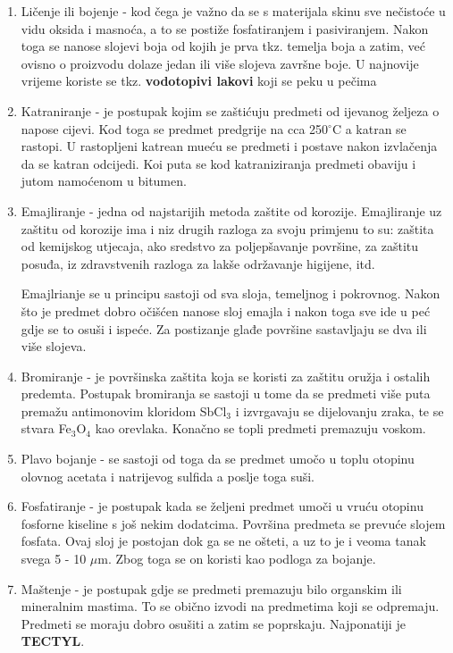 \documentclass[a4paper,12pt]{article}
\numberwithin{figure}{section}
\begin{document}
\begin{enumerate}
\item Ličenje ili bojenje - kod čega je važno da se s materijala skinu sve nečistoće u vidu oksida i masnoća, a to se postiže fosfatiranjem i pasiviranjem. Nakon toga se nanose slojevi boja od kojih je prva tkz. temelja boja a zatim, već ovisno o proizvodu dolaze jedan ili više slojeva završne boje. U najnovije vrijeme koriste se tkz. \textbf{vodotopivi lakovi} koji se peku u pečima
\item Katraniranje - je postupak kojim se zaštićuju predmeti od ijevanog željeza o napose cijevi. Kod toga se predmet predgrije na cca 250$^{\circ}$C a katran se rastopi. U rastopljeni katrean mueću se predmeti i postave nakon izvlačenja da se katran odcijedi. Koi puta se kod katraniziranja predmeti obaviju i jutom namoćenom u bitumen.
\item Emajliranje - jedna od najstarijih metoda zaštite od korozije. Emajliranje uz zaštitu od korozije ima i niz drugih razloga za svoju primjenu to su: zaštita od kemijskog utjecaja, ako sredstvo za poljepšavanje površine, za zaštitu posuđa, iz zdravstvenih razloga za lakše održavanje higijene, itd.\par
Emajlrianje se u principu sastoji od sva sloja, temeljnog i pokrovnog. Nakon što je predmet dobro očišćen nanose sloj emajla i nakon toga sve ide u peć gdje se to osuši i ispeće. Za postizanje glađe površine sastavljaju se dva ili više slojeva.
\item Bromiranje - je površinska zaštita koja se koristi za zaštitu oružja i ostalih predemta. Postupak bromiranja se sastoji u tome da se predmeti više puta premažu antimonovim kloridom SbCl$_{3}$ i izvrgavaju se dijelovanju zraka, te se stvara Fe$_{3}$O$_{4}$ kao orevlaka. Konačno se topli predmeti premazuju voskom.
\item Plavo bojanje - se sastoji od toga da se predmet umočo u toplu otopinu olovnog acetata i natrijevog sulfida a poslje toga suši.
\item Fosfatiranje - je postupak kada se željeni predmet umoči u vruću otopinu fosforne kiseline s još nekim dodatcima. Površina predmeta se prevuće slojem fosfata. Ovaj sloj je postojan dok ga se ne ošteti, a uz to je i veoma tanak svega 5 - 10 $\mu$m. Zbog toga se on koristi kao podloga za bojanje.
\item Maštenje - je postupak gdje se predmeti premazuju bilo organskim ili mineralnim mastima. To se obično izvodi na predmetima koji se odpremaju. Predmeti se moraju dobro osušiti a zatim se poprskaju. Najponatiji je \textbf{TECTYL}. 
\end{enumerate} 
\end{document}
